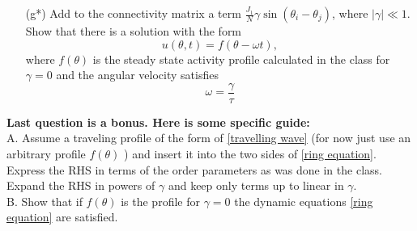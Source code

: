 \documentclass{article}
\begin{document}
\begin{enumerate}
\item[(g*)] Add to the connectivity matrix a term $\frac{J_1}{N}\gamma \sin(\theta_i - \theta_j)$, where $|\gamma|\ll 1$. Show that there is a solution with the form
\begin{equation}
u(\theta, t) = f(\theta - \omega t), \label{travelling wave}
\end{equation}
where  $f(\theta)$ is the steady state activity profile calculated in the class for $\gamma = 0$  and the angular velocity satisfies  
\begin{equation}
\omega = \frac{\gamma}{\tau}
\end{equation}
\end{enumerate}
\textbf{Last question is a bonus. Here is some specific guide:}
\\
A. Assume a traveling profile of the form of \ref{travelling wave} (for now just use an arbitrary profile $f(\theta)$ ) and insert it into the two sides of \ref{ring equation}. Express the RHS in terms of the order parameters as was done in the class. Expand the RHS in powers of $\gamma$ and keep only terms up to linear in $\gamma$.
\\
B. Show that if $f(\theta)$ is the profile for $\gamma = 0$ the dynamic equations \ref{ring equation} are satisfied. 
\end{document}
